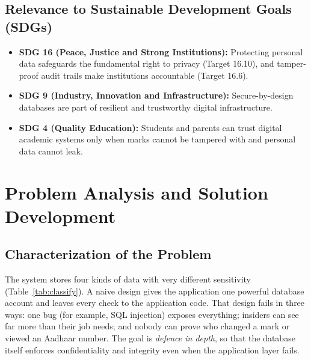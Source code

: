 \documentclass[11pt,a4paper]{report}
\begin{document}
\subsection{Relevance to Sustainable Development Goals (SDGs)}
\begin{itemize}
    \item \textbf{SDG 16 (Peace, Justice and Strong Institutions):} Protecting personal data safeguards the fundamental right to privacy (Target 16.10), and tamper-proof audit trails make institutions accountable (Target 16.6).
    \item \textbf{SDG 9 (Industry, Innovation and Infrastructure):} Secure-by-design databases are part of resilient and trustworthy digital infrastructure.
    \item \textbf{SDG 4 (Quality Education):} Students and parents can trust digital academic systems only when marks cannot be tampered with and personal data cannot leak.
\end{itemize}


\section{Problem Analysis and Solution Development}

\subsection{Characterization of the Problem}
The system stores four kinds of data with very different sensitivity (Table~\ref{tab:classify}). A naive design gives the application one powerful database account and leaves every check to the application code. That design fails in three ways: one bug (for example, SQL injection) exposes everything; insiders can see far more than their job needs; and nobody can prove who changed a mark or viewed an Aadhaar number. The goal is \emph{defence in depth}, so that the database itself enforces confidentiality and integrity even when the application layer fails.
\end{document}
